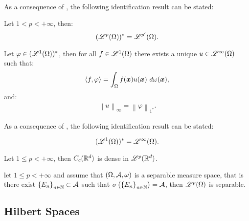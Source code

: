 As a consequence of , the following identification result can be stated:

\begin{theorem}
    Let $1 < p < +\infty$, then:
    \begin{align}
        (\mathscr{L}^{p}(\Omega))^* = \mathscr{L}^{p^{\prime}}(\Omega).
    \end{align}
\end{theorem}

\begin{theorem}[Riesz representation theorem for $p = 1$] \label{theorem:riesz_1}
    Let $\varphi \in (\mathscr{L}^{1}(\Omega))^*$, then for all $f \in \mathscr{L}^{1}(\Omega)$ there exists a unique $u \in \mathscr{L}^{\infty}(\Omega)$ such that:
    \begin{align}
        \langle f, \varphi \rangle = \int_{\Omega} f(\bm{x}) u(\bm{x}) ~ d \omega(\bm{x}),
    \end{align}
    and:
    \begin{align}
        \left\lVert u \right\rVert_{\infty} = \left\lVert \varphi \right\rVert_{1^*}.
    \end{align}
\end{theorem}

As a consequence of , the following identification result can be stated:

\begin{theorem}
    \begin{align}
        (\mathscr{L}^{1}(\Omega))^* = \mathscr{L}^{\infty}(\Omega).
    \end{align}
\end{theorem}

\begin{theorem}
    Let $1 \leq p < +\infty$, then $C_c(\mathbb{R}^{d})$ is dense in $\mathscr{L}^{p}(\mathbb{R}^{d})$.
\end{theorem}

\begin{theorem}
    let $1 \leq p < +\infty$ and assume that $(\Omega, \mathcal{A}, \omega)$ is a separable measure space, that is there exist $\left\{ E_n \right\}_{n \in \mathbb{N}} \subset \mathcal{A}$ such that $\sigma \left( \left\{ E_n \right\}_{n \in \mathbb{N}} \right) = \mathcal{A}$, then $\mathscr{L}^{p}(\Omega)$ is separable.
\end{theorem}

\newpage
\subsection{Hilbert Spaces} \label{subsection:hilbert}

